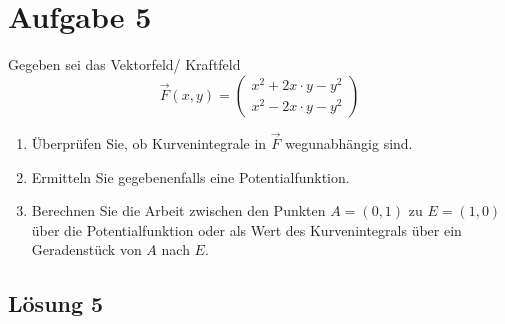 \documentclass[main.tex]{subfiles}
\begin{document}
\section{Aufgabe 5}
Gegeben sei das Vektorfeld/ Kraftfeld
\begin{equation*}
\vec{F}(x,y)
= \left( \begin{array}{c}
	x^2 + 2x \cdot y - y^2 \\ 
	x^2 - 2x \cdot y - y^2
\end{array} \right) 
\end{equation*}
\begin{enumerate}
\item Überprüfen Sie, ob Kurvenintegrale in $\vec{F}$ wegunabhängig sind.
\item Ermitteln Sie gegebenenfalls eine Potentialfunktion.
\item Berechnen Sie die Arbeit zwischen den Punkten $A = (0, 1)$ zu $E = (1, 0)$ über die Potentialfunktion oder als Wert des Kurvenintegrals über ein Geradenstück von $A$ nach $E$.
\end{enumerate}

\subsection{Lösung 5}
\end{document}
